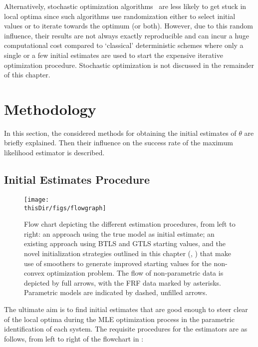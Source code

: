 \begin{remark}
Alternatively, stochastic optimization algorithms~\citep{Spall2012,Press2007} are less likely to get stuck in local optima since such algorithms use randomization either to select initial values or to iterate towards the optimum (or both).
However, due to this random influence, their results are not always exactly reproducible and can incur a huge computational cost compared to `classical' deterministic schemes where only a single or a few initial estimates are used to start the expensive iterative optimization procedure.
Stochastic optimization is not discussed in the remainder of this chapter.
\end{remark}

\section{Methodology}\label{sec:initial-values:MethodEg}
In this section, the considered methods for obtaining the initial estimates of $\theta$ are briefly explained. Then their influence on the success rate of the maximum likelihood estimator is described.

\subsection{Initial Estimates Procedure}\label{sec:init:procedures}
\begin{figure}[p]
  \centering
  \texttt{[image: \\thisDir/figs/flowgraph]}
  \caption[Flow chart of different initialization procedures.]{Flow chart depicting the different estimation procedures, from left to right:  an approach using the true model as initial estimate;  an existing approach using \gls{BTLS} and \gls{GTLS} starting values, and the novel initialization strategies outlined in this chapter (, ) that make use of smoothers to generate improved starting values for the non-convex optimization problem.
  The flow of non-parametric data is depicted by full arrows, with the \gls{FRF} data marked by asterisks. Parametric models are indicated by dashed, unfilled arrows.} 
  \label{fig:flowgraph}
\end{figure}

The ultimate aim is to find initial estimates that are good enough to steer clear of the local optima during the \gls{MLE} optimization process in the parametric identification of each system. 
The requisite procedures for the estimators are as follows, from left to right of the flowchart in :

